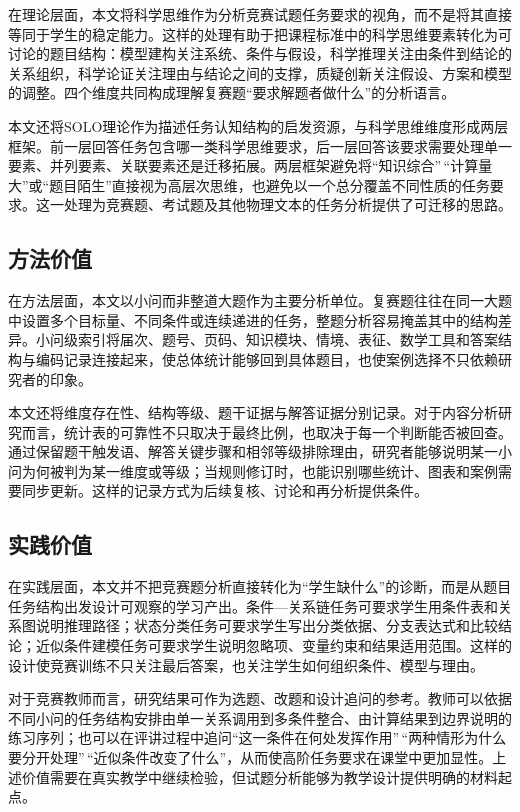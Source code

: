 \documentclass[
  12pt,
  a4paper,twoside,openany]{ctexbook}
\begin{document}
在理论层面，本文将科学思维作为分析竞赛试题任务要求的视角，而不是将其直接等同于学生的稳定能力。这样的处理有助于把课程标准中的科学思维要素转化为可讨论的题目结构：模型建构关注系统、条件与假设，科学推理关注由条件到结论的关系组织，科学论证关注理由与结论之间的支撑，质疑创新关注假设、方案和模型的调整。四个维度共同构成理解复赛题``要求解题者做什么''的分析语言。

本文还将SOLO理论作为描述任务认知结构的启发资源，与科学思维维度形成两层框架。前一层回答任务包含哪一类科学思维要求，后一层回答该要求需要处理单一要素、并列要素、关联要素还是迁移拓展。两层框架避免将``知识综合''\,``计算量大''或``题目陌生''直接视为高层次思维，也避免以一个总分覆盖不同性质的任务要求。这一处理为竞赛题、考试题及其他物理文本的任务分析提供了可迁移的思路。

\subsection{方法价值}\label{ux65b9ux6cd5ux4ef7ux503c}

在方法层面，本文以小问而非整道大题作为主要分析单位。复赛题往往在同一大题中设置多个目标量、不同条件或连续递进的任务，整题分析容易掩盖其中的结构差异。小问级索引将届次、题号、页码、知识模块、情境、表征、数学工具和答案结构与编码记录连接起来，使总体统计能够回到具体题目，也使案例选择不只依赖研究者的印象。

本文还将维度存在性、结构等级、题干证据与解答证据分别记录。对于内容分析研究而言，统计表的可靠性不只取决于最终比例，也取决于每一个判断能否被回查。通过保留题干触发语、解答关键步骤和相邻等级排除理由，研究者能够说明某一小问为何被判为某一维度或等级；当规则修订时，也能识别哪些统计、图表和案例需要同步更新。这样的记录方式为后续复核、讨论和再分析提供条件。

\subsection{实践价值}\label{ux5b9eux8df5ux4ef7ux503c}

在实践层面，本文并不把竞赛题分析直接转化为``学生缺什么''的诊断，而是从题目任务结构出发设计可观察的学习产出。条件---关系链任务可要求学生用条件表和关系图说明推理路径；状态分类任务可要求学生写出分类依据、分支表达式和比较结论；近似条件建模任务可要求学生说明忽略项、变量约束和结果适用范围。这样的设计使竞赛训练不只关注最后答案，也关注学生如何组织条件、模型与理由。

对于竞赛教师而言，研究结果可作为选题、改题和设计追问的参考。教师可以依据不同小问的任务结构安排由单一关系调用到多条件整合、由计算结果到边界说明的练习序列；也可以在评讲过程中追问``这一条件在何处发挥作用''\,``两种情形为什么要分开处理''\,``近似条件改变了什么''，从而使高阶任务要求在课堂中更加显性。上述价值需要在真实教学中继续检验，但试题分析能够为教学设计提供明确的材料起点。
\end{document}

